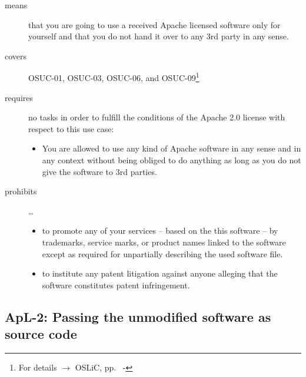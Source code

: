 \begin{description}

\item[means] that you are going to use a received Apache licensed software only
for yourself and that you do not hand it over to any 3rd party in any sense.

\item[covers] OSUC-01, OSUC-03, OSUC-06, and OSUC-09\footnote{For details 
$\rightarrow$ OSLiC, pp.\ \pageref{OSUC-01-DEF} - \pageref{OSUC-09-DEF}}

\item[requires] no tasks in order to fulfill the conditions of the Apache 2.0
license with respect to this use case:
  \begin{itemize}
    \item You are allowed to use any kind of Apache software in any sense and in
    any context without being obliged to do anything as long as you do not
    give the software to 3rd parties.
  \end{itemize}
  
\item[prohibits] \ldots
\begin{itemize}
  \item to promote any of your services – based on the this software – by
  trademarks, service marks, or product names linked to the software except as
  required for unpartially describing the used software file.
  \item to institute any patent litigation against anyone alleging that the
  software constitutes patent infringement.
\end{itemize}

\end{description}

\subsection{ApL-2: Passing the unmodified software as source code}
\label{OSUC-02-Apache20} \label{OSUC-05-Apache20} \label{OSUC-07-Apache20} 

